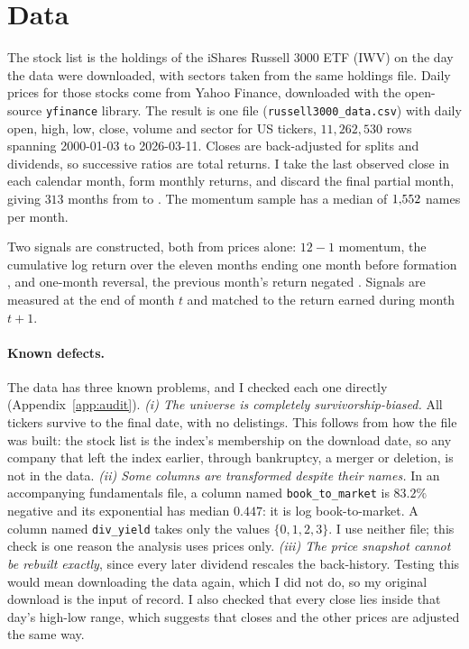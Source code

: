 \documentclass[11pt,a4paper]{article}
\begin{document}
\section{Data}\label{sec:data}

The stock list is the holdings of the iShares Russell 3000 ETF (IWV) on the day the data
were downloaded, with sectors taken from the same holdings file. Daily prices for those
stocks come from Yahoo Finance, downloaded with the open-source \texttt{yfinance} library.
The result is one file (\texttt{russell3000\_data.csv}) with daily open, high, low, close,
volume and sector for \nTickers{} US tickers, $11{,}262{,}530$ rows spanning 2000-01-03 to
2026-03-11. Closes are
back-adjusted for splits and dividends, so successive ratios are total returns. I take
the last observed close in each calendar month, form monthly returns, and discard the
final partial month, giving $313$ months from \panelStart{} to \panelEnd{}. The momentum sample has a
median of $1{,}552$ names per month.

Two signals are constructed, both from prices alone: $12-1$ momentum, the cumulative log
return over the eleven months ending one month before formation
\citep{jegadeesh1993returns}, and one-month reversal, the previous month's return
negated \citep{jegadeesh1990evidence}. Signals are measured at the end of month $t$ and
matched to the return earned during month $t+1$.

\paragraph{Known defects.}
The data has three known problems, and I checked each one directly
(Appendix~\ref{app:audit}). \emph{(i) The universe is completely survivorship-biased.}
All \nTickers{} tickers survive to the final date, with no
delistings. This follows from how the file was built: the stock list is the index's
membership on the download date, so any company that left the index earlier, through
bankruptcy, a merger or deletion, is not in the data. \emph{(ii) Some columns are
transformed despite their names.} In an
accompanying fundamentals file, a column named \texttt{book\_to\_market} is $83.2\%$
negative and its exponential has median $0.447$: it is log book-to-market. A column named
\texttt{div\_yield} takes only the values $\{0,1,2,3\}$. I use neither file; this check
is one reason the analysis uses prices only. \emph{(iii) The price snapshot cannot be
rebuilt exactly}, since every later dividend rescales the back-history. Testing this
would mean downloading the data again, which I did not do, so my original download is
the input of record. I also checked that every close lies inside that day's high-low
range, which suggests that closes and the other prices are adjusted the same way.
\end{document}
